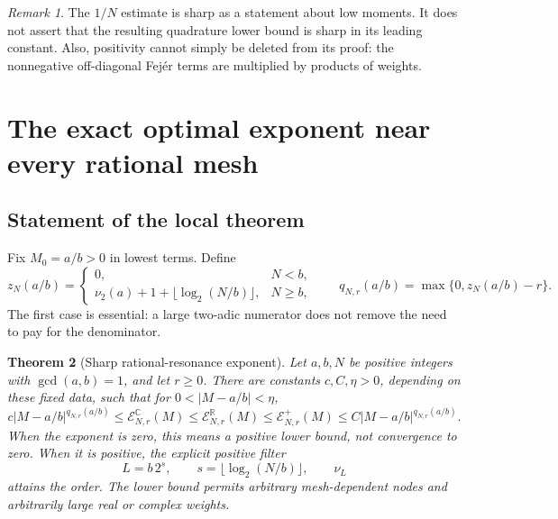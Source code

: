 \documentclass[11pt,a4paper]{article}
\numberwithin{equation}{section}
\theoremstyle{plain}
\newtheorem{theorem}{Theorem}[section]
\theoremstyle{definition}
\theoremstyle{remark}
\newtheorem{remark}[theorem]{Remark}
\newcommand{\R}{\mathbb R}\newcommand{\C}{\mathbb C}
\newcommand{\Err}{\mathcal E}
\begin{document}
\begin{remark}
The $1/N$ estimate is sharp as a statement about low moments. It does not
assert that the resulting quadrature lower bound is sharp in its leading
constant. Also, positivity cannot simply be deleted from its proof: the
nonnegative off-diagonal Fej\'er terms are multiplied by products of weights.
\end{remark}

\section{The exact optimal exponent near every rational mesh}
\label{sec:resonance}

\subsection{Statement of the local theorem}

Fix $M_0=a/b>0$ in lowest terms. Define
\begin{equation}\label{eq:zN}
 z_N(a/b)=
 \begin{cases}
 0,&N<b,\\
 \nu_2(a)+1+\lfloor\log_2(N/b)\rfloor,&N\ge b,
 \end{cases}
 \qquad q_{N,r}(a/b)=\max\{0,z_N(a/b)-r\}.
\end{equation}
The first case is essential: a large two-adic numerator does not remove the
need to pay for the denominator.

\begin{theorem}[Sharp rational-resonance exponent]\label{thm:resonance}
Let $a,b,N$ be positive integers with $\gcd(a,b)=1$, and let $r\ge0$.
There are constants $c,C,\eta>0$, depending on these fixed data, such that
for $0<|M-a/b|<\eta$,
\begin{equation}\label{eq:resonance}
 c|M-a/b|^{q_{N,r}(a/b)}
 \le\Err_{N,r}^{\C}(M)
 \le\Err_{N,r}^{\R}(M)
 \le\Err_{N,r}^{+}(M)
 \le C|M-a/b|^{q_{N,r}(a/b)}.
\end{equation}
When the exponent is zero, this means a positive lower bound, not convergence
to zero. When it is positive, the explicit positive filter
\begin{equation}\label{eq:optimalordergrid}
 L=b\,2^s,\qquad s=\lfloor\log_2(N/b)\rfloor,\qquad \nu_L
\end{equation}
attains the order. The lower bound permits arbitrary mesh-dependent nodes and
arbitrarily large real or complex weights.
\end{theorem}
\end{document}
